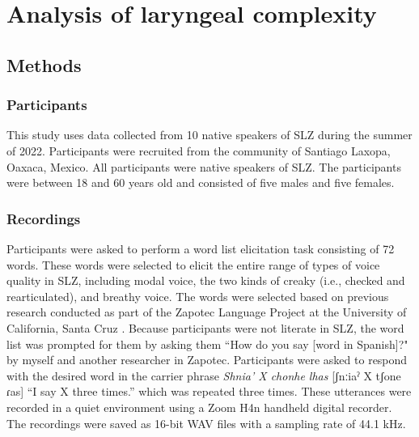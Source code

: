 \section{Analysis of laryngeal complexity}\label{sec:analysis_of_lc}
\subsection{Methods} \label{sec:methods}
\subsubsection{Participants} \label{sec:participants}
This study uses data collected from 10 native speakers of SLZ during the summer of 2022. Participants were recruited from the community of Santiago Laxopa, Oaxaca, Mexico. All participants were native speakers of SLZ. The participants were between 18 and 60 years old and consisted of five males and five females.

\subsubsection{Recordings} \label{sec:recordings} 
Participants were asked to perform a word list elicitation task consisting of 72 words. These words were selected to elicit the entire range of types of voice quality in SLZ, including modal voice, the two kinds of creaky (i.e., checked and rearticulated), and breathy voice. The words were selected based on previous research conducted as part of the Zapotec Language Project at the University of California, Santa Cruz \citep{ZapotecLanguageProject}. 
Because participants were not literate in SLZ, the word list was prompted for them by asking them ``How do you say [word in Spanish]?" by myself and another researcher in Zapotec. Participants were asked to respond with the desired word in the carrier phrase \textit{Shnia' X chonhe lhas} [ʃnːiaˀ X tʃone ɾas] ``I say X three times.'' which was repeated three times. These utterances were recorded in a quiet environment using a Zoom H4n handheld digital recorder. The recordings were saved as 16-bit WAV files with a sampling rate of 44.1 kHz.

